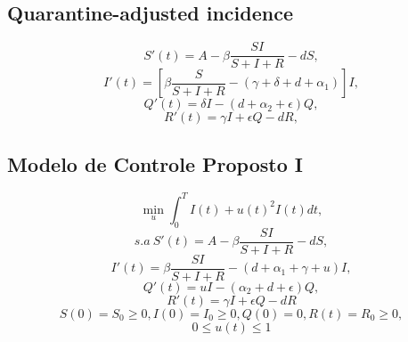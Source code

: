 \subsection{Quarantine-adjusted incidence}

$$ S'(t) = A - \beta \frac{SI}{S + I + R} - dS,$$
$$ I'(t) = [\beta \frac{S}{S + I + R}  - (\gamma + \delta + d + \alpha_1)]I,$$
$$ Q'(t) = \delta I - (d + \alpha_2 + \epsilon)Q,$$
$$ R'(t) = \gamma I + \epsilon Q - dR, $$

\subsection{Modelo de Controle Proposto I}

$$\min_{u} \int_0^T I(t) + u(t)^2I(t) dt, $$
$$ s.a~ S'(t) = A - \beta\frac{SI}{S + I + R} - dS, $$
$$ I'(t) = \beta\frac{SI}{S + I + R} - (d + \alpha_1 + \gamma + u)I,  $$
$$ Q'(t) = uI - (\alpha_2 + d + \epsilon)Q,$$
$$ R'(t) = \gamma I + \epsilon Q - dR $$
$$ S(0) = S_0 \geq 0, I(0) = I_0  \geq 0, Q(0) = 0, R(t) = R_0 \geq 0,$$
$$ 0 \leq u(t) \leq 1 $$ 
